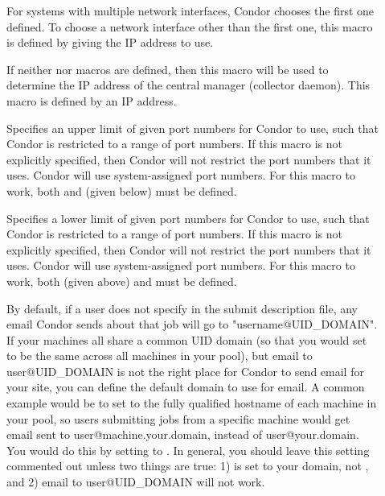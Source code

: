 \begin{description}
\item[] \label{param:NetworkInterface}
  For systems with multiple network interfaces, Condor chooses the
  first one defined.  To choose a network interface other than the
  first one, this macro is defined by giving the IP address
  to use.

\item[] \label{param:CMIPAddr}
  If neither  nor 
   macros are defined, then this
  macro will be used to determine the IP address of the central
  manager (collector daemon).
  This macro is defined by an IP address.

\item[] \label{param:HighPort}
  Specifies an upper limit of given port numbers for Condor to use,
  such that Condor is restricted to a range of port numbers.
  If this macro is not explicitly specified, then Condor will
  not restrict the port numbers that it uses. Condor will use
  system-assigned port numbers.
  For this macro to work, both  and
   (given below) must be defined.

\item[] \label{param:LowPort}
  Specifies a lower limit of given port numbers for Condor to use,
  such that Condor is restricted to a range of port numbers.
  If this macro is not explicitly specified, then Condor will
  not restrict the port numbers that it uses. Condor will use
  system-assigned port numbers.
  For this macro to work, both  (given above) and
   must be defined.

\item[] \label{param:EmailDomain}
  By default, if a user does not specify  in the
  submit description file, any email Condor sends about that job will
  go to "username@UID\_DOMAIN".
  If your machines all share a common UID domain (so that you would
  set  to be the same across all machines in your
  pool), but email to user@UID\_DOMAIN is not the right place for
  Condor to send email for your site, you can define the default
  domain to use for email.
  A common example would be to set  to the fully
  qualified hostname of each machine in your pool, so users submitting
  jobs from a specific machine would get email sent to
  user@machine.your.domain, instead of user@your.domain.  
  You would do this by setting  to
  . 
  In general, you should leave this setting commented out unless two
  things are true: 1)  is set to your domain, not
  , and 2) email to user@UID\_DOMAIN will not 
  work. 


\end{description}
